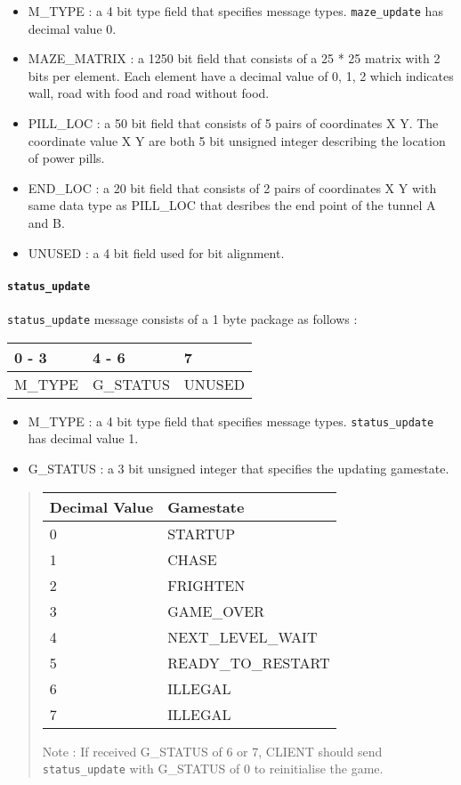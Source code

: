 \documentclass[]{article}
\let\oldparagraph\paragraph
\renewcommand{\paragraph}[1]{\oldparagraph{#1}\mbox{}}
\begin{document}
\begin{itemize}
\item
  M\_TYPE : a 4 bit type field that specifies message types.
  \texttt{maze\_update} has decimal value 0.
\item
  MAZE\_MATRIX : a 1250 bit field that consists of a 25 * 25 matrix with
  2 bits per element. Each element have a decimal value of 0, 1, 2 which
  indicates wall, road with food and road without food.
\item
  PILL\_LOC : a 50 bit field that consists of 5 pairs of coordinates X
  Y. The coordinate value X Y are both 5 bit unsigned integer describing
  the location of power pills.
\item
  END\_LOC : a 20 bit field that consists of 2 pairs of coordinates X Y
  with same data type as PILL\_LOC that desribes the end point of the
  tunnel A and B.
\item
  UNUSED : a 4 bit field used for bit alignment.
\end{itemize}

\hypertarget{status_update}{%
\paragraph{\texorpdfstring{\texttt{status\_update}}{status\_update}}\label{status_update}}

\texttt{status\_update} message consists of a 1 byte package as follows
:

\begin{longtable}[]{@{}lll@{}}
\toprule
0 - 3 & 4 - 6 & 7\tabularnewline
\midrule
\endhead
M\_TYPE & G\_STATUS & UNUSED\tabularnewline
\bottomrule
\end{longtable}

\begin{itemize}
\item
  M\_TYPE : a 4 bit type field that specifies message types.
  \texttt{status\_update} has decimal value 1.
\item
  G\_STATUS : a 3 bit unsigned integer that specifies the updating
  gamestate.
\end{itemize}

\begin{quote}
\begin{longtable}[]{@{}ll@{}}
\toprule
Decimal Value & Gamestate\tabularnewline
\midrule
\endhead
0 & STARTUP\tabularnewline
1 & CHASE\tabularnewline
2 & FRIGHTEN\tabularnewline
3 & GAME\_OVER\tabularnewline
4 & NEXT\_LEVEL\_WAIT\tabularnewline
5 & READY\_TO\_RESTART\tabularnewline
6 & ILLEGAL\tabularnewline
7 & ILLEGAL\tabularnewline
\bottomrule
\end{longtable}

Note : If received G\_STATUS of 6 or 7, CLIENT should send
\texttt{status\_update} with G\_STATUS of 0 to reinitialise the game.
\end{quote}
\end{document}
